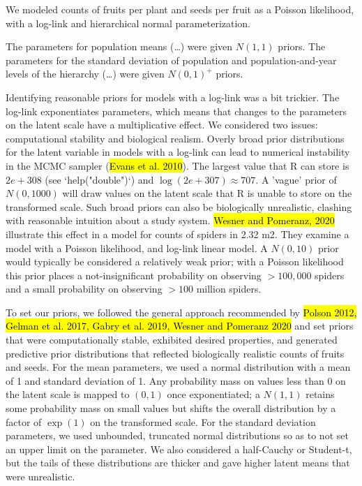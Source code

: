 \documentclass[12pt, oneside, titlepage]{article}   	%
\begin{document}
We modeled counts of fruits per plant and seeds per fruit as a Poisson likelihood, with a log-link and hierarchical normal parameterization. 

The parameters for population means (\dots) were given $N(1,1)$ priors. The parameters for the standard deviation of population and population-and-year levels of the hierarchy (\dots) were given $N(0,1)^+$ priors. 

Identifying reasonable priors for models with a log-link was a bit trickier. The log-link exponentiates parameters, which means that changes to the parameters on the latent scale have a multiplicative effect. We considered two issues: computational stability and biological realism. Overly broad prior distributions for the latent variable in models with a log-link can lead to numerical instability in the MCMC sampler (\hl{Evans et al. 2010}). The largest value that R can store is $2e+308$ (see `help("double")`) and $\log(2e+307) \approx 707$. A 'vague' prior of $N(0,1000)$ will draw values on the latent scale that R is unable to store on the transformed scale. Such broad priors can also be biologically unrealistic, clashing with reasonable intuition about a study system. \hl{Wesner and Pomeranz, 2020} illustrate this effect in a model for counts of spiders in 2.32 m2. They examine a model with a Poisson likelihood, and log-link linear model. A $N(0,10)$ prior would typically be considered a relatively weak prior; with a Poisson likelihood this prior places a not-insignificant probability on observing $>100,000$ spiders and a small probability on observing $>100$ million spiders. 

To set our priors, we followed the general approach recommended by \hl{Polson 2012, Gelman et al. 2017, Gabry et al. 2019, Wesner and Pomeranz 2020} and set priors that were computationally stable, exhibited desired properties, and generated predictive prior distributions that reflected biologically realistic counts of fruits and seeds. For the mean parameters, we used a normal distribution with a mean of 1 and standard deviation of 1. Any probability mass on values less than 0 on the latent scale is mapped to $(0,1)$ once exponentiated; a $N(1,1)$ retains some probability mass on small values but shifts the overall distribution by a factor of $\exp(1)$ on the transformed scale. For the standard deviation parameters, we used unbounded, truncated normal distributions so as to not set an upper limit on the parameter. We also considered a half-Cauchy or Student-t, but the tails of these distributions are thicker and gave higher latent means that were unrealistic.
\end{document}
